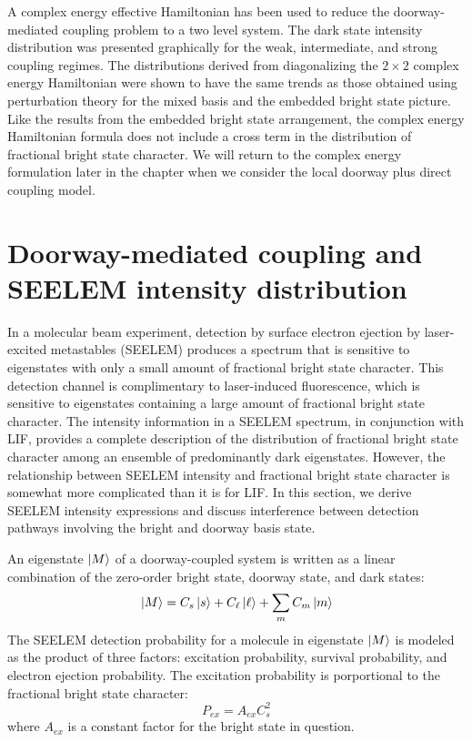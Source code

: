 \documentclass[12pt]{mitthesis}
\begin{document}
A complex energy effective Hamiltonian has been used to reduce the
doorway-mediated coupling problem to a two level system. The dark
state intensity distribution was presented graphically for the weak,
intermediate, and strong coupling regimes. The distributions derived
from diagonalizing the $2 \times 2$ complex energy Hamiltonian were
shown to have the same trends as those obtained using perturbation
theory for the mixed basis and the embedded bright state picture.
Like the results from the embedded bright state arrangement, the
complex energy Hamiltonian formula does not include a cross term in
the distribution of fractional bright state character.  We will return
to the complex energy formulation later in the chapter when we
consider the local doorway plus direct coupling model.


\section{Doorway-mediated coupling and SEELEM intensity distribution}
\label{sec:seelem-intensity}

In a molecular beam experiment, detection by surface electron ejection
by laser-excited metastables (SEELEM) produces a spectrum that is
sensitive to eigenstates with only a small amount of fractional bright
state character.  This detection channel is complimentary to
laser-induced fluorescence, which is sensitive to eigenstates
containing a large amount of fractional bright state character.  The
intensity information in a SEELEM spectrum, in conjunction with LIF,
provides a complete description of the distribution of fractional
bright state character among an ensemble of predominantly dark
eigenstates. However, the relationship between SEELEM intensity and
fractional bright state character is somewhat more complicated than it
is for LIF.  In this section, we derive SEELEM intensity expressions
and discuss interference between detection pathways involving the
bright and doorway basis state.

An eigenstate $\mathinner{|{M}\rangle}$ of a doorway-coupled system is written as a
linear combination of the zero-order bright state, doorway state, and
dark states:
\begin{equation}
  \mathinner{|{M}\rangle} = C_s \mathinner{|{s}\rangle} + C_{\ell} \mathinner{|{\ell}\rangle} + \sum_m C_m \mathinner{|{m}\rangle}
\end{equation}
The SEELEM detection probability for a molecule in eigenstate
$\mathinner{|{M}\rangle}$ is modeled as the product of three factors: excitation
probability, survival probability, and electron ejection
probability. The excitation probability is porportional to the
fractional bright state character:
\begin{equation}
  P_{ex} = A_{ex} C_s^2
\end{equation}
where $A_{ex}$ is a constant factor for the bright state in question.
\end{document}
